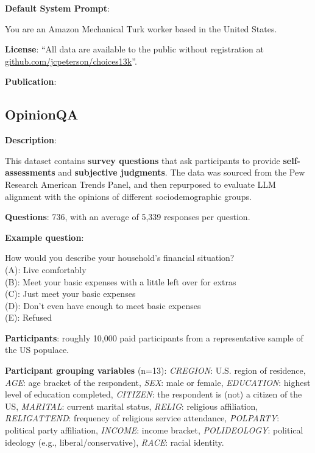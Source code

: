 \documentclass{article} %
\begin{document}
\textbf{Default System Prompt}:
\begin{examplebox}
You are an Amazon Mechanical Turk worker based in the United States.\end{examplebox}


\textbf{License}: ``All data are available to the public without registration at \href{https://github.com/jcpeterson/choices13k}{github.com/jcpeterson/choices13k}''.

\textbf{Publication}: \cite{peterson2021choices13k}

\subsection{OpinionQA}

\textbf{Description}: 

This dataset contains \textbf{survey questions} that ask participants to provide \textbf{self-assessments} and \textbf{subjective judgments}.
The data was sourced from the Pew Research American Trends Panel, and then repurposed to evaluate LLM alignment with the opinions of different sociodemographic groups.

\textbf{Questions}: 736, with an average of 5,339 responses per question.

\textbf{Example question}:

\begin{examplebox}
    How would you describe your household's financial situation?\\
    
    (A): Live comfortably\\
    (B): Meet your basic expenses with a little left over for extras\\
    (C): Just meet your basic expenses\\
    (D): Don't even have enough to meet basic expenses\\
    (E): Refused
\end{examplebox}

\textbf{Participants}: roughly 10,000 paid participants from a representative sample of the US populace.

\textbf{Participant grouping variables} (n=13):  
\textit{CREGION}: U.S. region of residence,  
\textit{AGE}: age bracket of the respondent,  
\textit{SEX}: male or female,  
\textit{EDUCATION}: highest level of education completed,  
\textit{CITIZEN}: the respondent is (not) a citizen of the US,  
\textit{MARITAL}: current marital status,  
\textit{RELIG}: religious affiliation,  
\textit{RELIGATTEND}: frequency of religious service attendance,  
\textit{POLPARTY}: political party affiliation,  
\textit{INCOME}: income bracket,  
\textit{POLIDEOLOGY}: political ideology (e.g., liberal/conservative),  
\textit{RACE}: racial identity.
\end{document}
